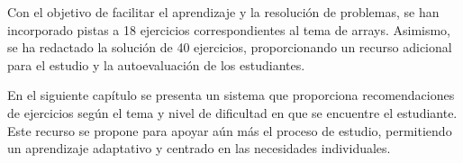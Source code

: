 Con el objetivo de facilitar el aprendizaje y la resolución de problemas, se han incorporado pistas a 18 ejercicios correspondientes al tema de arrays. Asimismo, se ha redactado la solución de 40 ejercicios, proporcionando un recurso adicional para el estudio y la autoevaluación de los estudiantes.

En el siguiente capítulo se presenta un sistema que proporciona recomendaciones de ejercicios según el tema y nivel de dificultad en que se encuentre el estudiante. Este recurso se propone para apoyar aún más el proceso de estudio, permitiendo un aprendizaje adaptativo y centrado en las necesidades individuales.